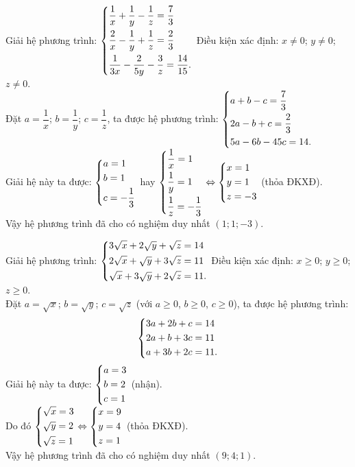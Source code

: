 \begin{ex}%
 Giải hệ phương trình: $\left\{\begin{aligned}& \dfrac{1}{x} + \dfrac{1}{y} - \dfrac{1}{z} = \dfrac{7}{3}\\& \dfrac{2}{x} - \dfrac{1}{y} + \dfrac{1}{z} = \dfrac{2}{3} \\& \dfrac{1}{3x} - \dfrac{2}{5y} - \dfrac{3}{z} = \dfrac{14}{15}.\end{aligned}\right.$
 \loigiai
  {
  Điều kiện xác định: $x \neq 0$; $y \neq 0$; $z \neq 0$.\\
  Đặt $a = \dfrac{1}{x}$; $b = \dfrac{1}{y}$; $c = \dfrac{1}{z}$, ta được hệ phương trình:
  $\left\{\begin{aligned}& a + b - c = \dfrac{7}{3} \\& 2a - b + c = \dfrac{2}{3} \\& 5a - 6b - 45c = 14.\end{aligned}\right.$\\
  Giải hệ này ta được: $\left\{\begin{aligned}& a = 1 \\& b = 1 \\& c = -\dfrac{1}{3}\end{aligned}\right.$ hay $\left\{\begin{aligned}& \dfrac{1}{x} = 1 \\& \dfrac{1}{y} = 1 \\& \dfrac{1}{z} = -\dfrac{1}{3}\end{aligned}\right. \Leftrightarrow \left\{\begin{aligned}& x = 1 \\& y = 1 \\& z = -3\end{aligned}\right.$ (thỏa ĐKXĐ).\\
  Vậy hệ phương trình đã cho có nghiệm duy nhất $(1;1;-3)$.
  }
\end{ex}


\begin{ex}%
 Giải hệ phương trình: $\left\{\begin{aligned}& 3 \sqrt{x} + 2 \sqrt{y} + \sqrt{z} = 14 \\& 2 \sqrt{x} + \sqrt{y} + 3 \sqrt{z} = 11 \\& \sqrt{x} + 3 \sqrt{y} + 2 \sqrt{z} = 11.\end{aligned}\right.$
 \loigiai
  {
  Điều kiện xác định: $x \geq 0$; $y \geq 0$; $z \geq 0$.\\
  Đặt $a = \sqrt{x}$; $b = \sqrt{y}$; $c = \sqrt{z}$ (với $a \geq 0$, $b \geq 0$, $c \geq 0$), ta được hệ phương trình:
  $$\left\{\begin{aligned}& 3a + 2b + c = 14 \\& 2a + b + 3c = 11 \\& a + 3b + 2c = 11.\end{aligned}\right.$$
  Giải hệ này ta được: $\left\{\begin{aligned}& a = 3 \\& b = 2 \\& c = 1\end{aligned}\right.$ (nhận).\\
  Do đó $\left\{\begin{aligned}& \sqrt{x} = 3 \\& \sqrt{y} = 2 \\& \sqrt{z} = 1\end{aligned}\right. \Leftrightarrow \left\{\begin{aligned}& x = 9 \\& y = 4 \\& z = 1\end{aligned}\right.$ (thỏa ĐKXĐ).\\
  Vậy hệ phương trình đã cho có nghiệm duy nhất $(9;4;1)$.
  }
\end{ex}


